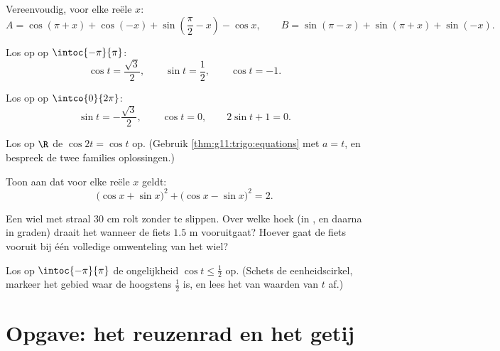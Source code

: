 \begin{exercise}[$\star\star$]\label{exo:g11:trigo:5}
Vereenvoudig, voor elke reële $x$:
\[
A = \cos(\pi + x) + \cos(-x) + \sin\left(\frac\pi2 - x\right) - \cos x,
\qquad
B = \sin(\pi - x) + \sin(\pi + x) + \sin(-x) .
\]
\end{exercise}

\begin{exercise}[$\star\star$]\label{exo:g11:trigo:6}
Los op op $\intoc{-\pi}{\pi}$:
\[
\cos t = \frac{\sqrt3}{2}, \qquad
\sin t = \frac12, \qquad
\cos t = -1 .
\]
\end{exercise}

\begin{exercise}[$\star\star$]\label{exo:g11:trigo:7}
Los op op $\intco{0}{2\pi}$:
\[
\sin t = -\frac{\sqrt3}{2}, \qquad
\cos t = 0, \qquad
2\sin t + 1 = 0 .
\]
\end{exercise}

\begin{exercise}[$\star\star$]\label{exo:g11:trigo:8}
Los op $\R$ de  $\cos 2t = \cos t$ op. (Gebruik
\cref{thm:g11:trigo:equations} met $a = t$, en bespreek de twee families
oplossingen.)
\end{exercise}

\begin{exercise}[$\star\star$]\label{exo:g11:trigo:9}
Toon aan dat voor elke reële $x$ geldt:
\[
\bigl(\cos x + \sin x\bigr)^2 + \bigl(\cos x - \sin x\bigr)^2 = 2 .
\]
\end{exercise}

\begin{exercise}[$\star\star$]\label{exo:g11:trigo:10}
Een wiel met straal $30$ cm rolt zonder te slippen. Over welke hoek (in
, en daarna in graden) draait het wanneer de fiets $1.5$ m
vooruitgaat? Hoever gaat de fiets vooruit bij één volledige omwenteling van
het wiel?
\end{exercise}

\begin{exercise}[$\star\star\star$]\label{exo:g11:trigo:11}
Los op $\intoc{-\pi}{\pi}$ de ongelijkheid $\cos t \leq \frac12$ op. (Schets
de eenheidscirkel, markeer het gebied waar de  hoogstens $\frac12$ is,
en lees het  van waarden van $t$ af.)
\end{exercise}

\section{Opgave: het reuzenrad en het getij}

